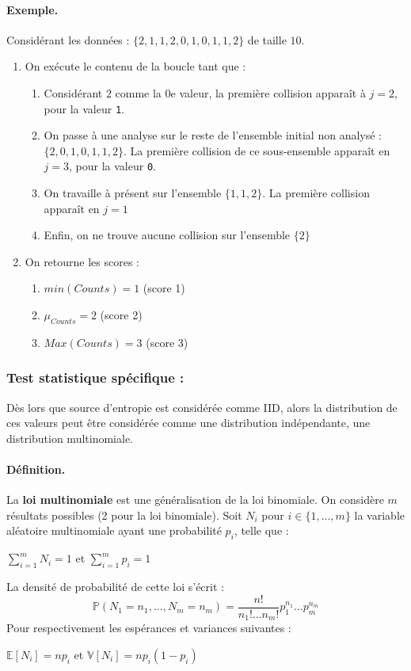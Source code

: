 \paragraph{Exemple.\\}
Considérant les données : $ \lbrace 2, 1, 1, 2, 0, 1, 0, 1, 1, 2 \rbrace$ de taille $10$.
\begin{enumerate}
\item On exécute le contenu de la boucle tant que : 
	\begin{enumerate}
	\item Considérant $2$ comme la $0$e valeur, la première collision apparaît à $j=2$, pour la valeur \texttt{1}.
	\item On passe à une analyse sur le reste de l'ensemble initial non analysé : $ \lbrace 2, 0, 1, 0, 1, 1, 2 \rbrace$. La première collision de ce sous-ensemble apparaît en $j=3$, pour la valeur \texttt{0}.
	\item On travaille à présent sur l'ensemble  $ \lbrace  1, 1, 2 \rbrace$. La première collision apparaît en $j=1$
	\item Enfin, on ne trouve aucune collision sur l'ensemble $\lbrace 2 \rbrace $
	\end{enumerate}
\item On retourne les scores : 
	\begin{enumerate}
	\item $min(Counts) = 1$ (score 1)
	\item $\mu_{Counts} = 2$ (score 2)
	\item $Max(Counts) = 3$ (score 3)
	\end{enumerate}

\end{enumerate}

\subsubsection{Test statistique spécifique : \chidpdf}
Dès lors que source d'entropie est considérée comme IID, alors la distribution de ces valeurs peut être considérée comme une distribution indépendante, une distribution multinomiale.

\paragraph{Définition.\\}
La \textbf{loi multinomiale} est une généralisation de la loi binomiale. On considère $m$ résultats possibles (2 pour la loi binomiale). Soit $N_i$ pour $i \in \lbrace1,...,m\rbrace$ la variable aléatoire multinomiale ayant une probabilité $p_i$, telle que :
\begin{center}
$ \sum \limits_{i=1}^{m} N_i = 1$ et  $\sum \limits_{i=1}^{m} p_i = 1$ 
\end{center}
La densité de probabilité de cette loi s'écrit : 
$$ \mathbb{P}(N_1=n_1, ..., N_m = n_m) = \frac{n!}{n_1! ... n_m!}p_1^{n_1}...p_m^{n_m}$$
Pour respectivement les espérances et variances suivantes :
\begin{center}
$ \mathbb{E}[N_i]=np_i$ et $\mathbb{V}[N_i]=np_i(1-p_i)$
\end{center}

